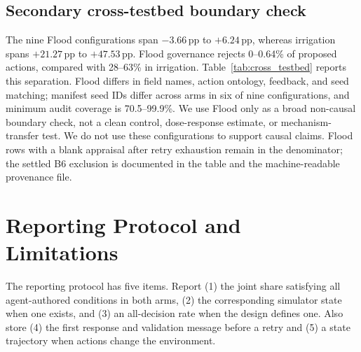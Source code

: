 \documentclass{article}
\newcommand{\pp}{\,\mathrm{pp}}
\begin{document}
\subsection{Secondary cross-testbed boundary check}

The nine Flood configurations span $-3.66\pp$ to $+6.24\pp$, whereas irrigation spans $+21.27\pp$ to $+47.53\pp$. Flood governance rejects 0--0.64\% of proposed actions, compared with 28--63\% in irrigation. Table~\ref{tab:cross_testbed} reports this separation. Flood differs in field names, action ontology, feedback, and seed matching; manifest seed IDs differ across arms in six of nine configurations, and minimum audit coverage is 70.5--99.9\%. We use Flood only as a broad non-causal boundary check, not a clean control, dose-response estimate, or mechanism-transfer test. We do not use these configurations to support causal claims. Flood rows with a blank appraisal after retry exhaustion remain in the denominator; the settled B6 exclusion is documented in the table and the machine-readable provenance file.

\newpage
\begin{table}[!h]
    \caption{\textbf{Secondary cross-testbed boundary check.} Values are ranges across configurations; each configuration is the mean of per-run means. $\Delta$ is no-validator minus validator-on. Both settings use high/very-high labels from a shared five-level appraisal instrument. Flood is a bounded non-causal check, not a paired comparison, dose-response estimate, or mechanism-transfer test. Coverage is 70.5\%--99.9\%; manifest seed IDs differ across arms in six configurations. Blank appraisals on retry-exhausted Flood rows remain in the denominator. The Flood gemma3:4b cell excludes one governed run with a divergent prompt (four governed and five no-validator runs); including it changes that cell from $+0.35\pp$ to $-1.16\pp$.}
    \label{tab:cross_testbed}
    \centering
    \scriptsize
    \setlength{\tabcolsep}{4.5pt}
    
\end{table}

\section{Reporting Protocol and Limitations}
\label{sec:reporting}

The reporting protocol has five items. Report (1) the joint share satisfying all agent-authored conditions in both arms, (2) the corresponding simulator state when one exists, and (3) an all-decision rate when the design defines one. Also store (4) the first response and validation message before a retry and (5) a state trajectory when actions change the environment.
\end{document}
